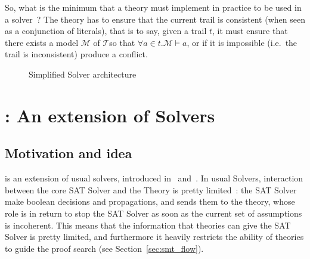 \documentclass{article}
\begin{document}
So, what is the minimum that a theory must implement in practice to be used in a
\smt{} solver~? The theory has to ensure that the current trail is consistent
(when seen as a conjunction of literals), that is to say, given a trail $t$,
it must ensure that there exists a model $\mathcal{M}$ of $\mathcal{T} $so that
$\forall a \in t. \mathcal{M} \vDash a$, or if it is impossible (i.e.~the trail
is inconsistent) produce a conflict.

\begin{figure}
  \begin{center}
  \end{center}
  \caption{Simplified \smt{} Solver architecture}\label{fig:smt_flow}
\end{figure}

\section{\mcsat{}: An extension of \smt{} Solvers}\label{sec:mcsat}

\subsection{Motivation and idea}

\mcsat{} is an extension of usual \smt{} solvers, introduced in~\cite{VMCAI13} and~\cite{FMCAD13}.
In usual \smt{} Solvers, interaction between the core SAT Solver and the Theory is pretty limited~:
the SAT Solver make boolean decisions and propagations, and sends them to the theory,
whose role is in return to stop the SAT Solver as soon as the current set of assumptions
is incoherent. This means that the information that theories can give the SAT Solver is
pretty limited, and furthermore it heavily restricts the ability of theories to guide
the proof search (see Section~\ref{sec:smt_flow}).
\end{document}
